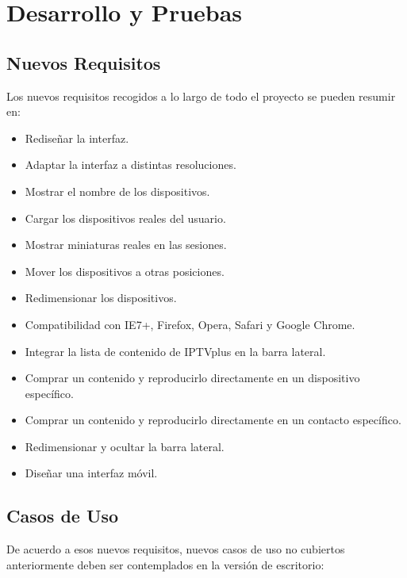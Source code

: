\nicesectionending

\section{Desarrollo y Pruebas} %
\label{sec:desarrollo_y_pruebas}

\subsection{Nuevos Requisitos} %
\label{sub:nuevos_requisitos}

Los nuevos requisitos recogidos a lo largo de todo el proyecto se pueden resumir en:

\begin{itemize}
  \item Rediseñar la interfaz.
  \item Adaptar la interfaz a distintas resoluciones.
  \item Mostrar el nombre de los dispositivos.
  \item Cargar los dispositivos reales del usuario.
  \item Mostrar miniaturas reales en las sesiones.
  \item Mover los dispositivos a otras posiciones.
  \item Redimensionar los dispositivos.
  \item Compatibilidad con IE7+, Firefox, Opera, Safari y Google Chrome.
  \item Integrar la lista de contenido de IPTVplus en la barra lateral.
  \item Comprar un contenido y reproducirlo directamente en un dispositivo específico.
  \item Comprar un contenido y reproducirlo directamente en un contacto específico.
  \item Redimensionar y ocultar la barra lateral.
  \item Diseñar una interfaz móvil.
\end{itemize}


\subsection{Casos de Uso} %
\label{sub:casos_de_uso}

De acuerdo a esos nuevos requisitos, nuevos casos de uso no cubiertos anteriormente deben ser contemplados en la versión de escritorio:

